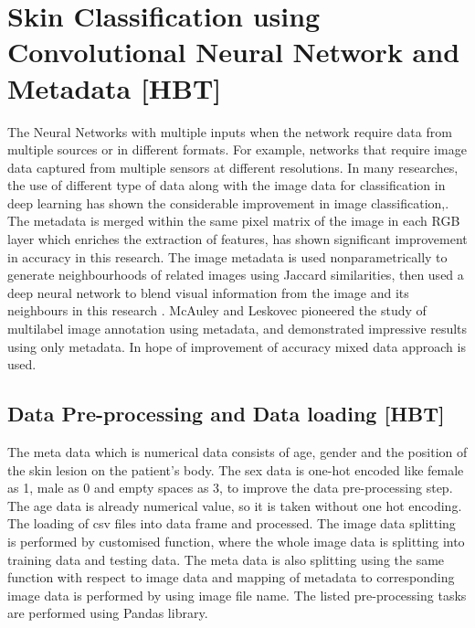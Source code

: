 

\section{Skin Classification using Convolutional Neural Network and Metadata [HBT]}\label{sec:metadata_cnn}
The Neural Networks with multiple inputs when the network require data from multiple sources or in different formats. For example, networks that require image data captured from multiple sensors at different resolutions. In many researches, the use of different type of data along with the image data for classification in deep learning has shown the considerable improvement in image classification\cite{love},\cite{melan}. The metadata is merged within the same pixel matrix of the image in each RGB layer which enriches the extraction of features, has shown significant improvement in accuracy in this research\cite{melan}. The image metadata is used nonparametrically to generate neighbourhoods of related images using Jaccard similarities, then used a deep neural network to blend visual information from the image and its neighbours in this research \cite{love}. McAuley and Leskovec pioneered the study of multilabel image annotation using metadata, and demonstrated impressive results using only metadata. In hope of improvement of accuracy mixed data approach is used.
\subsection{Data Pre-processing and Data loading [HBT]}
The meta data which is numerical data consists of age, gender and the position of the skin lesion on the patient’s body. The sex data is one-hot encoded like female as 1, male as 0 and empty spaces as 3, to improve the data pre-processing step. The age data is already numerical value, so it is taken without one hot encoding. The loading of csv files into data frame and processed. The image data splitting is performed by customised function, where the whole image data is splitting into training data and testing data. The meta data is also splitting using the same function with respect to image data and mapping of metadata to corresponding image data is performed by using image file name. The listed pre-processing tasks are performed using Pandas library.

